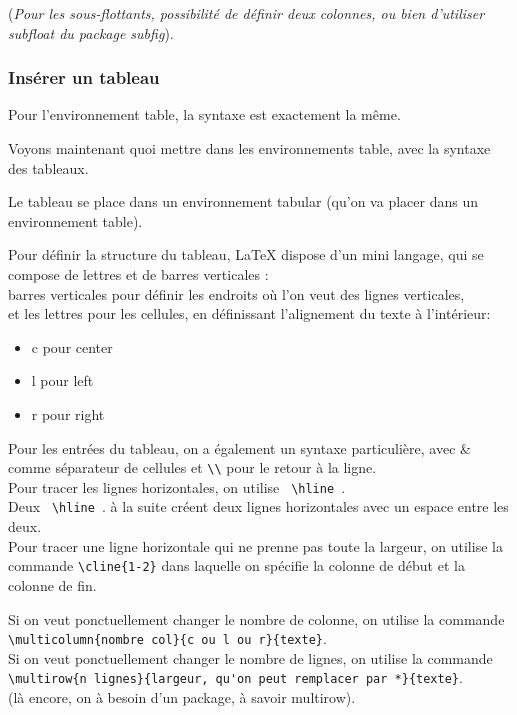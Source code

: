 \documentclass[a4paper,twoside,french,12pt]{article}
\begin{document}
(\textit{Pour les sous-flottants, possibilité de définir deux colonnes, ou bien d'utiliser subfloat du package subfig}).

\subsubsection{Insérer un tableau}

Pour l'environnement table, la syntaxe est exactement la même.

Voyons maintenant quoi mettre dans les environnements table, avec la syntaxe des tableaux.

Le tableau se place dans un environnement tabular (qu'on va placer dans un environnement table).

Pour définir la structure du tableau, LaTeX dispose d'un mini langage, qui se compose de lettres et de barres verticales :\\
barres verticales pour définir les endroits où l'on veut des lignes verticales,\\
et les lettres pour les cellules, en définissant l'alignement du texte à l'intérieur:
\begin{itemize}
\item c pour center
\item l pour left
\item r pour right
\end{itemize}

Pour les entrées du tableau, on a également un syntaxe particulière, avec \& comme séparateur de cellules et \verb=\\= pour le retour à la ligne.\\
Pour tracer les lignes horizontales, on utilise \verb= \hline =.\\
Deux \verb= \hline =. à la suite créent deux lignes horizontales avec un espace entre les deux.\\
Pour tracer une ligne horizontale qui ne prenne pas toute la largeur, on utilise la commande \verb=\cline{1-2}= dans laquelle on spécifie la colonne de début et la colonne de fin.


Si on veut ponctuellement changer le nombre de colonne, on utilise la commande\\ \verb=\multicolumn{nombre col}{c ou l ou r}{texte}=.\\
Si on veut ponctuellement changer le nombre de lignes, on utilise la commande\\ \verb=\multirow{n lignes}{largeur, qu'on peut remplacer par *}{texte}=.\\ (là encore, on à besoin d'un package, à savoir multirow).
\end{document}
